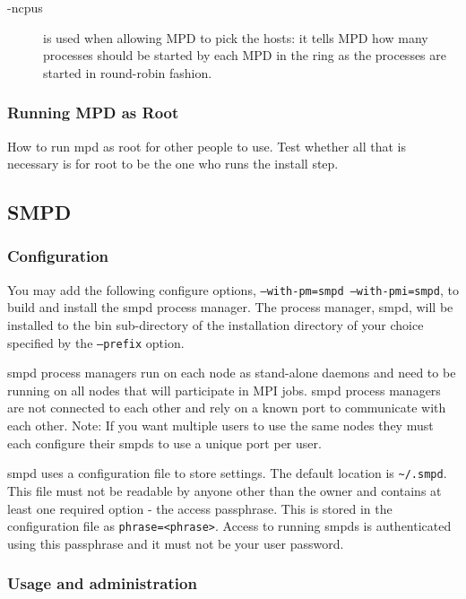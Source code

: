 \documentclass[dvipdfm,11pt]{article}
\begin{document}
\begin{description}
\item[-ncpus] is used when allowing MPD to pick the hosts: it tells MPD
  how many processes should be started by each MPD in the ring as the
  processes are started in round-robin fashion.
\end{description}

\subsubsection{Running MPD as Root}
\label{sec:mpd-root}

How to run mpd as root for other people to use.  Test whether all that
is necessary is for root to be the one who runs the install step.

\subsection{SMPD}
\label{sec:smpd}

\subsubsection{Configuration}
\label{sec:smpd_configure}

You may add the following configure options, 
\texttt{--with-pm=smpd --with-pmi=smpd}, 
to build and install the smpd process manager. The process manager, smpd, 
will be installed to the bin sub-directory of the installation directory 
of your choice specified by the \texttt{--prefix} option.

smpd process managers run on each node as stand-alone daemons and need to
be running on all nodes that will participate in MPI jobs.  smpd process 
managers are not connected to each other and rely on a known port to 
communicate with each other.  Note: If you want multiple users to use the 
same nodes they must each configure their smpds to use a unique port per 
user. 

smpd uses a configuration file to store settings.  The default location is 
\verb+~/.smpd+.  This file must not be readable by anyone other than 
the owner and contains at least one required option - the access passphrase.
This is stored in the configuration file as \texttt{phrase=<phrase>}. Access 
to running smpds is authenticated using this passphrase and it must 
not be your user password.

\subsubsection{Usage and administration}
\label{sec:smpd_usage}
\end{document}
